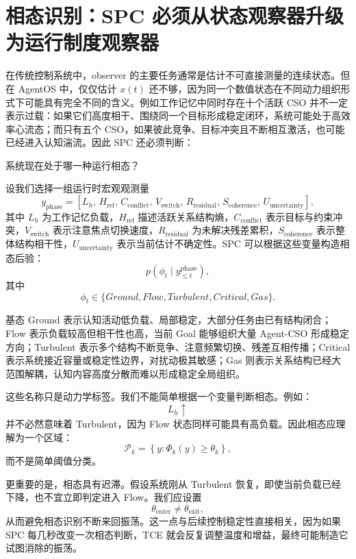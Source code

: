 \section{相态识别：SPC 必须从状态观察器升级为运行制度观察器}

在传统控制系统中，observer 的主要任务通常是估计不可直接测量的连续状态。但在 AgentOS 中，仅仅估计 $x(t)$ 还不够，因为同一个数值状态在不同动力组织形式下可能具有完全不同的含义。例如工作记忆中同时存在十个活跃 CSO 并不一定表示过载：如果它们高度相干、围绕同一个目标形成稳定闭环，系统可能处于高效率心流态；而只有五个 CSO，如果彼此竞争、目标冲突且不断相互激活，也可能已经进入认知湍流。因此 SPC 还必须判断：
\begin{proposition*}
系统现在处于哪一种运行相态？
\end{proposition*}

设我们选择一组运行时宏观观测量
\[
y_{\mathrm{phase}}
=
[
L_h,\,
H_{\mathrm{rel}},\,
C_{\mathrm{conflict}},\,
V_{\mathrm{switch}},\,
R_{\mathrm{residual}},\,
S_{\mathrm{coherence}},\,
U_{\mathrm{uncertainty}}
],
\]
其中 $L_h$ 为工作记忆负载，$H_{\mathrm{rel}}$ 描述活跃关系结构熵，$C_{\mathrm{conflict}}$ 表示目标与约束冲突，$V_{\mathrm{switch}}$ 表示注意焦点切换速度，$R_{\mathrm{residual}}$ 为未解决残差累积，$S_{\mathrm{coherence}}$ 表示整体结构相干性，$U_{\mathrm{uncertainty}}$ 表示当前估计不确定性。SPC 可以根据这些变量构造相态后验：
\[
p
\left(
\phi_t
\mid
y_{\leq t}^{\mathrm{phase}}
\right),
\]
其中
\[
\phi_t
\in
\{
Ground,
Flow,
Turbulent,
Critical,
Gas
\}.
\]

基态 Ground 表示认知活动低负载、局部稳定，大部分任务由已有结构闭合；Flow 表示负载较高但相干性也高，当前 Goal 能够组织大量 Agent-CSO 形成稳定方向；Turbulent 表示多个结构不断竞争、注意频繁切换、残差互相传播；Critical 表示系统接近容量或稳定性边界，对扰动极其敏感；Gas 则表示关系结构已经大范围解耦，认知内容高度分散而难以形成稳定全局组织。

这些名称只是动力学标签。我们不能简单根据一个变量判断相态。例如：
\[
L_h\uparrow
\]
并不必然意味着 Turbulent，因为 Flow 状态同样可能具有高负载。因此相态应理解为一个区域：
\[
\mathcal P_k
=
\left\{
y:
\Phi_k(y)\geq\theta_k
\right\},
\]
而不是简单阈值分类。

更重要的是，相态具有迟滞。假设系统刚从 Turbulent 恢复，即使当前负载已经下降，也不宜立即判定进入 Flow。我们应设置
\[
\theta_{\mathrm{enter}}
\neq
\theta_{\mathrm{exit}},
\]
从而避免相态识别不断来回振荡。这一点与后续控制稳定性直接相关，因为如果 SPC 每几秒改变一次相态判断，TCE 就会反复调整温度和增益，最终可能制造它试图消除的振荡。

